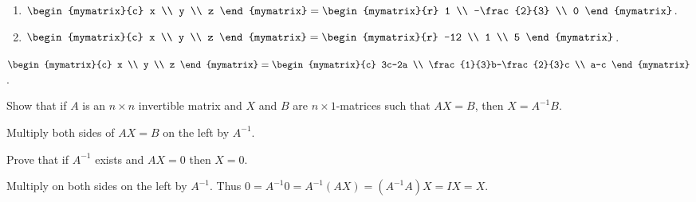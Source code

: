 \begin{ex}
  \begin{sol}
    \begin{enumerate}
    \item $\def\arraystretch{1.2}
      \begin{mymatrix}{c}
        x \\
        y \\
        z
      \end{mymatrix} =\begin{mymatrix}{r}
        1 \\
        -\frac{2}{3} \\
        0
      \end{mymatrix}$.
    \item $\begin{mymatrix}{c}
        x \\
        y \\
        z
      \end{mymatrix} = \begin{mymatrix}{r}
        -12 \\
        1 \\
        5
      \end{mymatrix}$.
    \end{enumerate}
    $\def\arraystretch{1.2}
    \begin{mymatrix}{c}
      x \\
      y \\
      z
    \end{mymatrix} =
    \begin{mymatrix}{c}
      3c-2a \\
      \frac{1}{3}b-\frac{2}{3}c \\
      a-c
    \end{mymatrix}$.
  \end{sol}
\end{ex}

\begin{ex}
  Show that if $A$ is an $n\times n$ invertible matrix and $X$ and $B$
  are $n\times 1$-matrices such that $AX=B$, then $X=A^{-1}B$.
  \begin{sol}
    Multiply both sides of $AX=B$ on the left by $A^{-1}$.
  \end{sol}
\end{ex}

\begin{ex}
  Prove that if $A^{-1}$ exists and $AX=0$ then $X=0$.
  \begin{sol}
    Multiply on both sides on the left by $A^{-1}$. Thus
    $0=A^{-1}0=A^{-1}(AX) =(A^{-1}A) X=IX = X$.
  \end{sol}
\end{ex}

